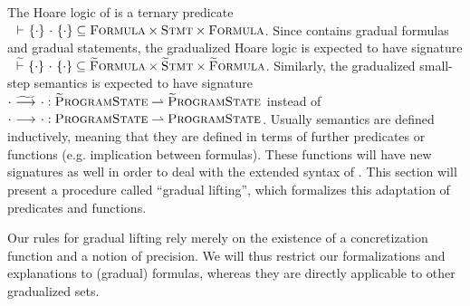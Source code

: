 The Hoare logic of \svl is a ternary predicate ${~} \,\,{\vdash}\,\, \{{\cdot}\} ~{\cdot}~ \{{\cdot}\} \subseteq \textup{\textsc{Formula}} \times \textup{\textsc{Stmt}} \times \textup{\textsc{Formula}}$.
Since \gvl contains gradual formulas and gradual statements, the gradualized Hoare logic is expected to have signature ${~} \,\,\widetilde{\vdash}\,\, \{{\cdot}\} ~{\cdot}~ \{{\cdot}\} \subseteq \textup{\textsc{\ensuremath{\widetilde{\text{F}}}ormula}} \times \textup{\textsc{\ensuremath{\widetilde{\text{S}}}tmt}} \times \textup{\textsc{\ensuremath{\widetilde{\text{F}}}ormula}}$.
Similarly, the gradualized small-step semantics is expected to have signature ${\cdot} \,\,{\widetilde{\longrightarrow}^{}}\,\, {\cdot} : \textup{\textsc{\ensuremath{\widetilde{\text{P}}}rogramState}} \rightharpoonup \textup{\textsc{\ensuremath{\widetilde{\text{P}}}rogramState}}$ instead of ${\cdot} \,\,{\longrightarrow^{}}\,\, {\cdot} : \textup{\textsc{ProgramState}} \rightharpoonup \textup{\textsc{ProgramState}}$.
Usually semantics are defined inductively, meaning that they are defined in terms of further predicates or functions (e.g. implication between formulas).
These functions will have new signatures as well in order to deal with the extended syntax of \gvl.
This section will present a procedure called “gradual lifting”, which formalizes this adaptation of predicates and functions.

\begin{comment}[Gradual Lifting]
    The procedure of extending an existing predicate/function in order to deal with gradual formulas.
    The resulting predicate/function has the same signature as the original one, with occurrences of \setFormula, \setStmt and \setProgramState replaced by \setGFormula, \setGStmt, \setGProgramState.
\end{comment}

Our rules for gradual lifting rely merely on the existence of a concretization function and a notion of precision.
We will thus restrict our formalizations and explanations to (gradual) formulas, whereas they are directly applicable to other gradualized sets.